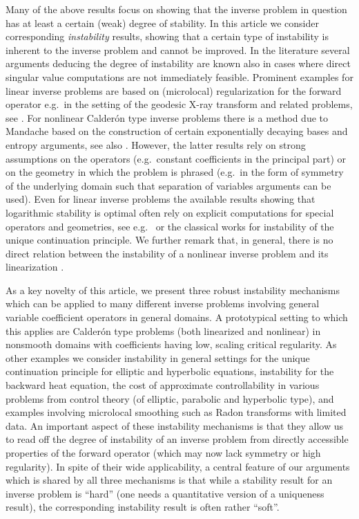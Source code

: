 \documentclass[12pt,twoside]{amsart}
\numberwithin{equation}{section}
\begin{document}
Many of the above results focus on showing that the inverse problem in question has at least a certain (weak) degree of stability. In this article we consider corresponding \emph{instability} results, showing that a certain type of instability is inherent to the inverse problem and cannot be improved. In the literature several arguments deducing the degree of instability are known also in cases where direct singular value computations are not immediately feasible. Prominent examples for linear inverse problems are based on (microlocal) regularization for the forward operator e.g.\ in the setting of the geodesic X-ray transform and related problems, see \cite{Quinto, Quinto1, SU09, StefanovUhlmann, SU13, MSU15, HU18}. For nonlinear Calder\'on type inverse problems there is a method due to Mandache \cite{Mandache} based on the construction of certain exponentially decaying bases and entropy arguments, see also \cite{DiCristoRondi,Isaev,IsaevI,IsaevII, A07, ZZ19}. However, the latter results rely on strong assumptions on the operators (e.g.\ constant coefficients in the principal part) or on the geometry in which the problem is phrased (e.g.\ in the form of symmetry of the underlying domain such that separation of variables arguments can be used). 
Even for linear inverse problems the available results showing that logarithmic stability is optimal often rely on explicit computations for special operators and geometries, see e.g.\ \cite{AnderssonBoman} or the classical works \cite{Hadamard, John} for instability of the unique continuation principle. We further remark that, in general, there is no direct relation between the instability of a nonlinear inverse problem and its linearization \cite[Appendix]{EKN89}.



As a key novelty of this article, we present three robust instability mechanisms which can be applied to many different inverse problems involving general variable coefficient operators in general domains. A prototypical setting to which this applies are Calder\'on type problems (both linearized and nonlinear) in nonsmooth domains with coefficients having low, scaling critical regularity. As other examples we consider instability in general settings for the unique continuation principle for elliptic and hyperbolic equations, instability for the backward heat equation, the cost of approximate controllability in various problems from control theory (of elliptic, parabolic and hyperbolic type), and examples involving microlocal smoothing such as Radon transforms with limited data. An important aspect of these instability mechanisms is that they allow us to read off the degree of instability of an inverse problem from directly accessible properties of the forward operator (which may now lack symmetry or high regularity). 
In spite of their wide applicability, a central feature of our arguments which is shared by all three mechanisms is that while a stability result for an inverse problem is ``hard'' (one needs a quantitative version of a uniqueness result), the corresponding instability result is often rather ``soft''. 
\end{document}
